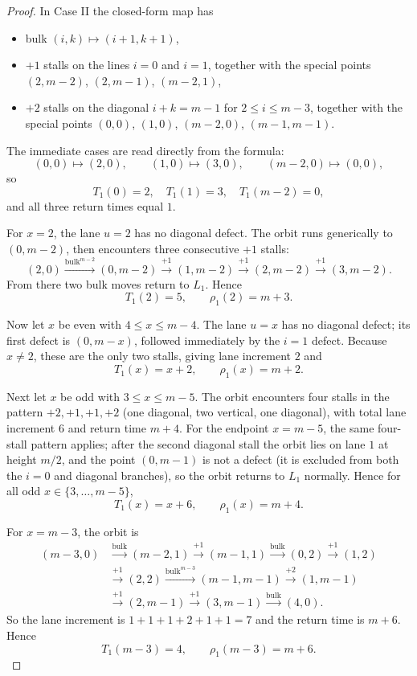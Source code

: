 \documentclass[11pt]{article}
\newcommand{\bulk}{\mathrm{bulk}}   %
\begin{document}
\begin{proof}
In Case II the closed-form map has
\begin{itemize}[leftmargin=2em]
\item bulk $(i,k)\mapsto(i+1,k+1)$,
\item $+1$ stalls on the lines $i=0$ and $i=1$, together with the special points
$(2,m-2)$, $(2,m-1)$, $(m-2,1)$,
\item $+2$ stalls on the diagonal $i+k=m-1$ for $2\le i\le m-3$, together with the special points
$(0,0)$, $(1,0)$, $(m-2,0)$, $(m-1,m-1)$.
\end{itemize}

The immediate cases are read directly from the formula:
\[
(0,0)\mapsto(2,0),\qquad (1,0)\mapsto(3,0),\qquad (m-2,0)\mapsto(0,0),
\]
so
\[
T_1(0)=2,\quad T_1(1)=3,\quad T_1(m-2)=0,
\]
and all three return times equal $1$.

For $x=2$, the lane $u=2$ has no diagonal defect.
The orbit runs generically to $(0,m-2)$, then encounters three consecutive $+1$ stalls:
\[
(2,0)\xrightarrow{\bulk^{m-2}}(0,m-2)\xrightarrow{+1}(1,m-2)\xrightarrow{+1}(2,m-2)\xrightarrow{+1}(3,m-2).
\]
From there two bulk moves return to $L_1$.
Hence
\[
T_1(2)=5,\qquad \rho_1(2)=m+3.
\]

Now let $x$ be even with $4\le x\le m-4$.
The lane $u=x$ has no diagonal defect; its first defect is $(0,m-x)$, followed immediately by the $i=1$ defect.
Because $x\neq 2$, these are the only two stalls, giving lane increment $2$ and
\[
T_1(x)=x+2,\qquad \rho_1(x)=m+2.
\]

Next let $x$ be odd with $3\le x\le m-5$.
The orbit encounters four stalls in the pattern $+2,+1,+1,+2$ (one diagonal, two vertical, one diagonal), with total lane increment $6$ and return time $m+4$.
For the endpoint $x=m-5$, the same four-stall pattern applies; after the second diagonal stall the orbit lies on lane $1$ at height $m/2$, and the point $(0,m-1)$ is not a defect (it is excluded from both the $i=0$ and diagonal branches), so the orbit returns to $L_1$ normally.
Hence for all odd $x\in\{3,\ldots,m-5\}$,
\[
T_1(x)=x+6,\qquad \rho_1(x)=m+4.
\]

For $x=m-3$, the orbit is
\[
\begin{aligned}
(m-3,0)&\xrightarrow{\bulk}(m-2,1)\xrightarrow{+1}(m-1,1)\xrightarrow{\bulk}(0,2)\xrightarrow{+1}(1,2)\\
&\xrightarrow{+1}(2,2)\xrightarrow{\bulk^{m-3}}(m-1,m-1)\xrightarrow{+2}(1,m-1)\\
&\xrightarrow{+1}(2,m-1)\xrightarrow{+1}(3,m-1)\xrightarrow{\bulk}(4,0).
\end{aligned}
\]
So the lane increment is $1+1+1+2+1+1=7$ and the return time is $m+6$.
Hence
\[
T_1(m-3)=4,\qquad \rho_1(m-3)=m+6.
\]


\end{proof}
\end{document}
